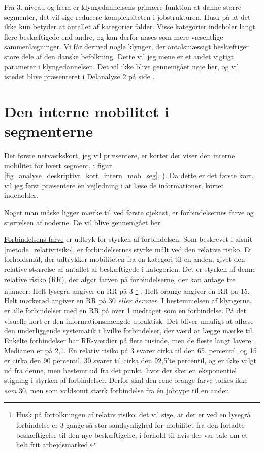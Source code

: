 Fra 3. niveau og frem er klyngedannelsens primære funktion at danne større segmenter, det vil sige reducere kompleksiteten i jobstrukturen. Husk på at det ikke kun betyder at antallet af kategorier falder. Visse kategorier indeholer langt flere beskæftigede end andre, og kan derfor anses som mere væsentlige sammenlægninger. Vi får dermed nogle klynger, der antalsmæssigt beskæftiger store dele af den danske befolkning. Dette vil jeg mene er et andet vigtigt parameter i klyngedannelsen. Det vil ikke blive gennemgået nøje her, og vil istedet blive præsenteret i Delanalyse 2 på side \pageref{kap_delanalyse2_socialeprocesser}.


\section{Den interne mobilitet i segmenterne \label{analyse_deskriptivt_within_mob_seg}}


Det første netværkskort, jeg vil præsentere, er kortet der viser den interne mobilitet for hvert segment,  i figur \ref{fig_analyse_deskriptivt_kort_intern_mob_seg}, ). %
Da dette er det første kort, vil jeg først præsentere en vejledning i at læse de informationer, kortet indeholder. 

Noget man måske ligger mærke til ved første øjekast, er forbindelsernes farve og størrelsen af noderne. De vil blive gennemgået her.

\underline{Forbindelsens farve} er udtryk for styrken af forbindelsen. Som beskrevet i afsnit \ref{metode_relativrisiko}, er forbindelsernes styrke målt ved den relative risiko. Et forholdsmål, der udtrykker mobiliteten fra en kategori til en anden, givet den relative størrelse af antallet af beskæftigede i kategorien. Det er styrken af denne relative risiko (RR), der afgør farven på forbindelserne, der kan antage tre nuancer: Helt lysegrå angiver en RR på 3%
%
\footnote{Husk på fortolkningen af relativ risiko:  det vil sige, at der er ved en lysegrå forbindelse er 3 gange så stor sandsynlighed for mobilitet fra den forladte beskæftigelse til den nye beskæftigelse, i forhold til hvis der var tale om et helt frit arbejdsmarked.}%
%
. Helt orange angiver en RR på 15. Helt mørkerød angiver en RR på 30 \emph{ eller derover}. I bestemmelsen af klyngerne, er alle forbindelser med en RR på over 1 medtaget som en forbindelse. På det visuelle kort er den informationsmængde upraktisk. Det bliver umuligt at aflæse den underliggende systematik i hvilke forbindelser, der værd at lægge mærke til. Enkelte forbindelser har RR-værdier på flere tusinde, men de fleste langt lavere: Medianen er på 2,1. En relativ risiko på 3 svarer cirka til den 65. percentil, og 15 er cirka den 90 percentil. 30 svarer til cirka den 92,5'te percentil, og er ikke valgt ud fra denne, men bestemt ud fra det punkt, hvor der sker en eksponentiel stigning i styrken af forbindelser. Derfor skal den rene orange farve tolkes ikke \emph{som} 30, men som voldsomt stærk forbindelse fra én jobtype til en anden. 

